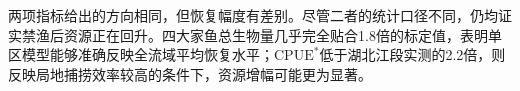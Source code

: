 两项指标给出的方向相同，但恢复幅度有差别。尽管二者的统计口径不同，仍均证实禁渔后资源正在回升。四大家鱼总生物量几乎完全贴合1.8倍的标定值，表明单区模型能够准确反映全流域平均恢复水平；$\mathrm{CPUE}^*$低于湖北江段实测的2.2倍，则反映局地捕捞效率较高的条件下，资源增幅可能更为显著。
